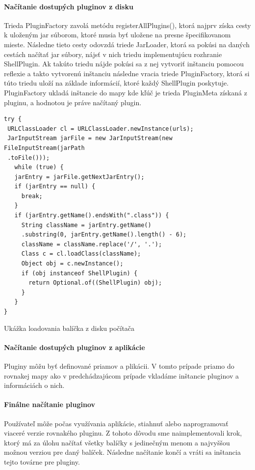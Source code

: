 \paragraph{Načítanie dostupých pluginov z disku} Trieda PluginFactory zavolá metódu registerAllPlugins(), ktorá najprv získa cesty k uloženým jar súborom, ktoré musia byť uložene na presne špecifikovanom mieste. Následne tieto cesty odovzdá triede JarLoader, ktorá sa pokúsi na daných cestách načítať \acrshort{jar} súbory, nájsť v nich triedu implementujúcu rozhranie ShellPlugin. Ak takúto triedu nájde pokúsi sa z nej vytvoriť inštanciu pomocou reflexie a takto vytvorenú inštanciu následne vracia triede PluginFactory, ktorá si túto triedu uloží na základe informácií, ktoré každý ShellPlugin poskytuje. PluginFactory ukladá inštancie do mapy kde kľúč je trieda PluginMeta získaná z pluginu, a hodnotou je práve načítaný plugin. 
\begin{algorithm}[H]
	\begin{verbatim}
try {
 URLClassLoader cl = URLClassLoader.newInstance(urls);
 JarInputStream jarFile = new JarInputStream(new FileInputStream(jarPath
 .toFile()));
   while (true) {
   jarEntry = jarFile.getNextJarEntry();
   if (jarEntry == null) {
     break;
   }
   if (jarEntry.getName().endsWith(".class")) {
     String className = jarEntry.getName()
     .substring(0, jarEntry.getName().length() - 6);
     className = className.replace('/', '.');
     Class c = cl.loadClass(className);
     Object obj = c.newInstance();
     if (obj instanceof ShellPlugin) {
       return Optional.of((ShellPlugin) obj);
     }
   }
}
	\end{verbatim}
	\caption{Ukážka loadovania balíčka z disku počítača}
	\label{alg:gen}
\end{algorithm}
\paragraph{Načítanie dostupých pluginov z aplikácie}
\indent Pluginy môžu byť definované priamov a plikácii. V tomto prípade priamo do rovnakej mapy ako v predchádzajúcom prípade vkladáme inštancie pluginov a informáciách o nich. 
\paragraph{Finálne načítanie pluginov}
\indent Používateľ môže počas využívania aplikácie, stiahnuť alebo naprogramovať viaceré verzie rovnakého pluginu. Z tohoto dôvodu sme naimplementovali  krok, ktorý má za úlohu načítať všetky balíčky s jedinečným menom a najvyššou možnou verziou pre daný balíček. Následne načítanie končí a vráti sa inštancia tejto továrne pre pluginy.
